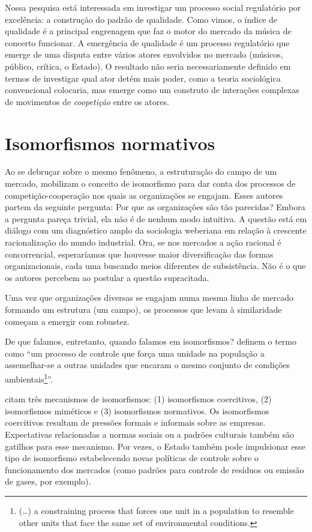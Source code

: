 \documentclass[a4paper, 12pt, openright, oneside, german, french, english, brazil]{abntex2}
\begin{document}
	Nossa pesquisa está interessada em investigar um processo social regulatório por excelência: a construção do padrão de qualidade. Como vimos, o índice de qualidade é a principal engrenagem que faz o motor do mercado da música de concerto funcionar. A emergência de qualidade é um processo regulatório que emerge de uma disputa entre vários atores envolvidos no mercado (músicos, público, crítica, o Estado). O resultado não seria necessariamente definido em termos de investigar qual ator detém mais poder, como a teoria sociológica convencional colocaria, mas emerge como um construto de interações complexas de movimentos de \textit{coopetição} entre os atores.
	
	\section{Isomorfismos normativos}

	Ao se debruçar sobre o mesmo fenômeno, a estruturação do campo de um mercado,  mobilizam o conceito de isomorfismo para dar conta dos processos de competição-cooperação nos quais as organizações se engajam. Esses autores partem da seguinte pergunta: Por que as organizações são tão parecidas? Embora a pergunta pareça trivial, ela não é de nenhum modo intuitiva. A questão está em diálogo com um diagnóstico amplo da sociologia weberiana em relação à crescente racionalização do mundo industrial. Ora, se nos mercados a ação racional é concorrencial, esperaríamos que houvesse maior diversificação das formas organizacionais, cada uma buscando meios diferentes de subsistência. Não é o que os autores percebem ao postular a questão supracitada. %

	Uma vez que organizações diversas se engajam numa mesma linha de mercado formando um estrutura (um campo), os processos que levam à similaridade começam a emergir com robustez.

	De que falamos, entretanto, quando falamos em isomorfismos?  definem o termo como ``um processo de controle que força uma unidade na população a assemelhar-se a outras unidades que encaram o mesmo conjunto de condições ambientais\footnote{(\dots) a constraining process that forces one unit in a population to resemble other units that face the same set of environmental conditions.}''.

	 citam três mecanismos de isomorfismos: (1) isomorfismos coercitivos, (2) isomorfismos miméticos e (3) isomorfismos normativos. Os isomorfismos coercitivos resultam de pressões formais e informais sobre as empresas. Expectativas relacionadas a normas sociais ou a padrões culturais também são gatilhos para esse mecanismo. Por vezes, o Estado também pode impulsionar esse tipo de isomorfismo estabelecendo novas políticas de controle sobre o funcionamento dos mercados (como padrões para controle de resíduos ou emissão de gases, por exemplo).
\end{document}

